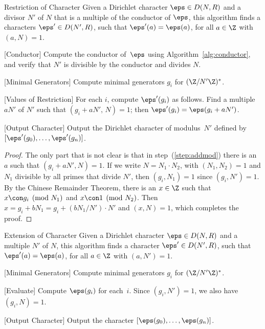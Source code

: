 \begin{algorithm}{Restriction of Character}\label{alg:restrict}
Given a Dirichlet character $\eps\in D(N,R)$ and a divisor
$N'$ of $N$ that is a multiple of the conductor of $\eps$,
this algorithm finds a characters $\eps' \in D(N',R)$, such
that $\eps'(a) = \eps(a)$, for all $a\in\Z$ with $(a,N)=1$.
\begin{steps}
\item{}[Conductor] Compute the conductor of~$\eps$ using
  Algorithm~\ref{alg:conductor}, and verify that $N'$ is
  divisible by the conductor and divides $N$.
\item{}[Minimal Generators] Compute minimal generators $g_i$ for
  $(\Z/N'\Z)^*$.
\item{}[Values of Restriction]\label{step:addmod} For each $i$,
  compute $\eps'(g_i)$ as follows.  Find a multiple $aN'$ of $N'$ such
  that $(g_i+aN',\,N)=1$; then $\eps'(g_i) = \eps(g_i+aN')$.
\item{}[Output Character] Output the Dirichlet character of modulus~$N'$
  defined by $[\eps'(g_0),\ldots, \eps'(g_n)]$.
\end{steps}
\end{algorithm}
\begin{proof}
The only part that is not clear is that in step~(\ref{step:addmod})
there is an $a$ such that $(g_i+aN', N)=1$.  If
we write $N=N_1\cdot N_2$, with $(N_1,N_2)=1$ and $N_1$ divisible
by all primes that divide $N'$, then $(g_i,N_1)=1$ since
$(g_i,N')=1$.  By the Chinese Remainder Theorem, 
there is an $x\in\Z$ such that $x\con g_i\pmod{N_1}$ and
$x\con 1\pmod{N_2}$. Then $x = g_i + b N_1 = g_i + (bN_1/N')\cdot N'$
and $(x,N)=1$, which completes the proof.
\end{proof}


\begin{algorithm}{Extension of Character}\label{alg:extend}
Given a Dirichlet character $\eps\in D(N,R)$ and a multiple
$N'$ of $N$,
this algorithm finds a character $\eps' \in D(N',R)$, such
that $\eps'(a) = \eps(a)$, for all $a\in\Z$ with $(a,N')=1$.
\begin{steps}
\item{}[Minimal Generators] Compute  minimal generators $g_i$ for
  $(\Z/N'\Z)^*$.
\item{}[Evaluate] Compute $\eps(g_i)$ for each~$i$.  Since $(g_i,N')=1$,
we also have $(g_i,N)=1$.
\item{}[Output Character] Output the character
$[\eps(g_0),\ldots, \eps(g_n)]$.
\end{steps}
\end{algorithm}


